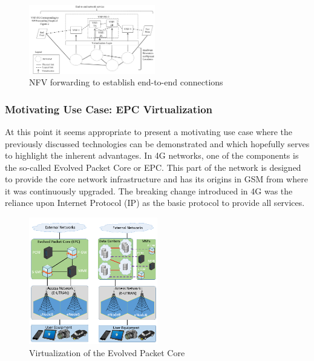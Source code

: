 \begin{figure}[h]
	\centering
	\includegraphics[width=0.49\textwidth]{images/nfv_forwarding.png}
	\caption{NFV forwarding to establish end-to-end connections \cite{ etsi1etsi}}
	\label{img:nfv_forward}
\end{figure}

\subsubsection{Motivating Use Case: EPC Virtualization}
At this point it seems appropriate to present a motivating use case where the previously discussed technologies can be demonstrated and which hopefully serves to highlight the inherent advantages. In 4G networks, one of the components is the so-called Evolved Packet Core or EPC. This part of the network is designed to provide the core network infrastructure and has its origins in GSM from where it was continuously upgraded. The breaking change introduced in 4G was the reliance upon Internet Protocol (IP) as the basic protocol to provide all services. 

\begin{figure}[h]
	\centering
	\includegraphics[width=0.5\textwidth]{images/epc_virt.png}
	\caption{Virtualization of the Evolved Packet Core \cite{mijumbi2016network}}
	\label{img:epc_virt}
\end{figure}

